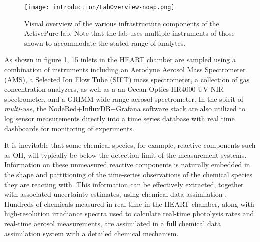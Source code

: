 \begin{figure}[h]
  \centering
  \texttt{[image: introduction/LabOverview-noap.png]}
	\caption{Visual overview of the various infrastructure components of the ActivePure lab. Note that the lab uses multiple instruments of those shown to accommodate the stated range of analytes.}
	\label{Figure.InstrumentOverview}
\end{figure}
As shown in figure \ref{Figure.InstrumentOverview}, 15 inlets in the HEART chamber are sampled using a combination of instruments including an Aerodyne Aerosol Mass Spectrometer (AMS), a Selected Ion Flow Tube (SIFT) mass spectrometer, a collection of gas concentration analyzers, as well as a an Ocean Optics HR4000 UV-NIR spectrometer, and a GRIMM wide range aerosol spectrometer. In the spirit of \textit{multi-use}, the NodeRed+InfluxDB+Grafana software stack are also utilized to log sensor measurements directly into a time series database with real time dashboards for monitoring of experiments.

It is inevitable that some chemical species, for example, reactive components such as $\mathrm{OH}$, will typically be below the detection limit of the measurement systems. Information on these unmeasured reactive components is naturally embedded in the shape and partitioning of the time-series observations of the chemical species they are reacting with. This information can be effectively extracted, together with associated uncertainty estimates, using chemical data assimilation \cite{ISI:A1995TA29300008, Lary1999a, Lary2003a}. Hundreds of chemicals measured in real-time in the HEART chamber, along with high-resolution irradiance spectra used to calculate real-time photolysis rates and real-time aerosol measurements, are assimilated in a full chemical data assimilation system with a detailed chemical mechanism.






